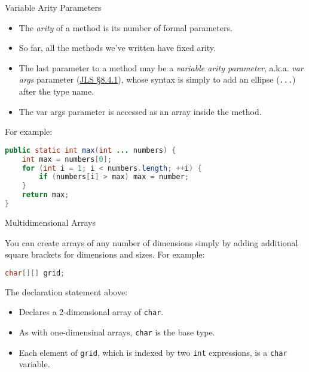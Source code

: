 \documentclass{beamer}
\begin{document}
\begin{frame}[fragile]{Variable Arity Parameters}


\begin{itemize}
\item The {\it arity} of a method is its number of formal parameters.
\item So far, all the methods we've written have fixed arity.
\item The last parameter to a method may be a {\it variable arity parameter}, a.k.a. {\it var args} parameter (\href{http://docs.oracle.com/javase/specs/jls/se8/html/jls-8.html#jls-8.4.1}{JLS \S 8.4.1}), whose syntax is simply to add an ellipse ({\tt ...}) after the type name.
\item The var args parameter is accessed as an array inside the method.
\end{itemize}
For example:
\begin{lstlisting}[language=Java]
public static int max(int ... numbers) {
    int max = numbers[0];
    for (int i = 1; i < numbers.length; ++i) {
        if (numbers[i] > max) max = number;
    }
    return max;
}
\end{lstlisting}

\end{frame}

\begin{frame}[fragile]{Multidimensional Arrays}


You can create arrays of any number of dimensions simply by adding additional square brackets for dimensions and sizes.  For example:

\begin{lstlisting}[language=Java]
char[][] grid;
\end{lstlisting}
The declaration statement above:
\begin{itemize}
\item Declares a 2-dimensional array of  {\tt char}.
\item As with one-dimensinal arrays, {\tt char} is the base type.
\item Each element of {\tt grid}, which is indexed by two {\tt int} expressions, is a {\tt char} variable.
\end{itemize}


\end{frame}
\end{document}
